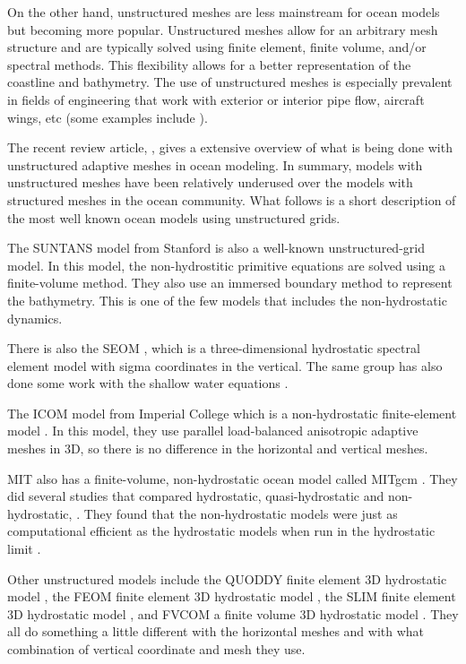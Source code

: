 On the other hand, unstructured meshes are less mainstream for ocean models but becoming more popular.  Unstructured meshes allow for an arbitrary mesh structure and are typically solved using finite element, finite volume, and/or spectral methods.  This flexibility allows for a better representation of the coastline and bathymetry.  The use of unstructured meshes is especially prevalent in fields of engineering that work with exterior or interior pipe flow, aircraft wings, etc (some examples include \cite{05MBLP, 97PM, 05ZTZN}).  

The recent review article, \cite{08PPGMK}, gives a extensive overview of what is being done with unstructured adaptive meshes in ocean modeling.  In summary, models with unstructured meshes have been relatively underused over the models with structured meshes in the ocean community.  What follows is a short description of the most well known ocean models using unstructured grids.  

The SUNTANS model from Stanford \cite{06FGS} is also a well-known unstructured-grid model.  In this model, the non-hydrostitic primitive equations are solved using a finite-volume method.  They also use an immersed boundary method to represent the bathymetry.  This is one of the few models that includes the non-hydrostatic dynamics.  

There is also the SEOM \cite{03IHL}, which is a three-dimensional hydrostatic spectral element model with sigma coordinates in the vertical.   The same group has also done some work with the shallow water equations \cite{04BILH}.

The ICOM model from Imperial College which is a non-hydrostatic finite-element model \cite{05PPGFGMEPO, 04FPPGOU, 05GPPOUG, 05PPGPG}.  In this model, they use parallel load-balanced anisotropic adaptive meshes in 3D, so there is no difference in the horizontal and vertical meshes.  

MIT also has a finite-volume, non-hydrostatic ocean model called MITgcm \cite{97MAHPH}.  They did several studies that compared hydrostatic, quasi-hydrostatic and non-hydrostatic, \cite{97MHPA}.  They found that the non-hydrostatic models were just as computational efficient as the hydrostatic models when run in the hydrostatic limit \cite{98MJH}.  

Other unstructured models include the QUODDY finite element 3D hydrostatic model \cite{96LINW}, the FEOM finite element 3D hydrostatic model \cite{04DKS}, the SLIM finite element 3D hydrostatic model \cite{07White}, and FVCOM a finite volume 3D hydrostatic model \cite{03CLB}.  They all do something a little different with the horizontal meshes and with what combination of vertical coordinate and mesh they use.  

